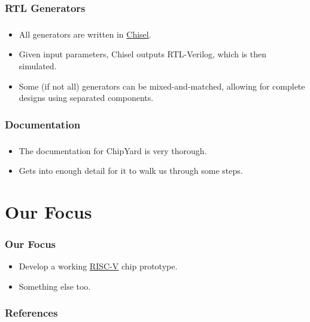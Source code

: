 \documentclass{weeklyslides}
\begin{document}
\subsubsection{RTL Generators}\label{subsubsec:RTL Generators}
\begin{frame}
  \frametitle{}
  \begin{itemize}
  \item All generators are written in \href{https://www.chisel-lang.org/}{Chisel}.
  \item Given input parameters, Chisel outputs RTL-Verilog, which is then simulated.
  \item Some (if not all) generators can be mixed-and-matched, allowing for complete designs using separated components.
  \end{itemize}
\end{frame}


\subsubsection{Documentation}\label{subsubsec:Doc}
\begin{frame}
  \frametitle{}
  \begin{itemize}
  \item The documentation for ChipYard is very thorough.
  \item Gets into enough detail for it to walk us through some steps.
  \end{itemize}
\end{frame}


\section{Our Focus}\label{sec:Our_Focus}
\begin{frame}
  \frametitle{Our Focus}
  \begin{itemize}
  \item Develop a working \href{https://riscv.org/}{RISC-V} chip prototype.
  \item Something else too.
  \end{itemize}

\end{frame}

\begin{frame}
  \frametitle{References}
  \printbibliography{}
\end{frame}
\end{document}
